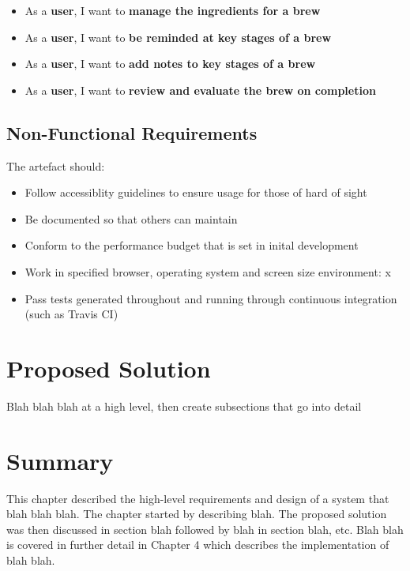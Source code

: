 \begin{itemize}
  \item As a \textbf{user}, I want to \textbf{manage the ingredients for a brew}
  \item As a \textbf{user}, I want to \textbf{be reminded at key stages of a brew}
  \item As a \textbf{user}, I want to \textbf{add notes to key stages of a brew}
  \item As a \textbf{user}, I want to \textbf{review and evaluate the brew on completion}
\end{itemize}

\subsection{Non-Functional Requirements} \label{a-d--requirements--non-functional}

The artefact should:

\begin{itemize}
  \item Follow accessiblity guidelines to ensure usage for those of hard of sight
  \item Be documented so that others can maintain
  \item Conform to the performance budget that is set in inital development
  \item Work in specified browser, operating system and screen size environment: x
  \item Pass tests generated throughout and running through continuous integration (such as Travis CI)
\end{itemize}

\section{Proposed Solution} \label{a-d--proposed-solution}

Blah blah blah at a high level, then create subsections that go into detail




\section{Summary} \label{a-d--summary}

This chapter described the high-level requirements and design of a system that blah blah blah.  The chapter started by describing blah.  The proposed solution was then discussed in section blah followed by blah in section blah, etc.
Blah blah is covered in further detail in Chapter 4 which describes the implementation of blah blah.
